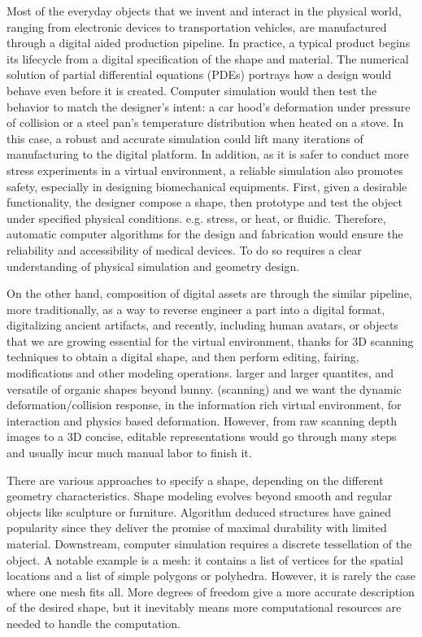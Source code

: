 Most of the everyday objects that we invent and interact in the physical world, ranging from electronic devices to transportation vehicles, are manufactured through a digital aided production pipeline.
In practice, a typical product begins its lifecycle from a digital specification of the shape and material.
The numerical solution of partial differential equations (PDEs) portrays how a design would behave even before it is created. 
Computer simulation would then test the behavior to match the designer's intent: a car hood's deformation under pressure of collision or a steel pan's temperature distribution when heated on a stove. In this case, a robust and accurate simulation could lift many iterations of manufacturing to the digital platform. In addition, as it is safer to conduct more stress experiments in a virtual environment, a reliable simulation also promotes safety, especially in designing biomechanical equipments. 
First, given a desirable functionality, the designer compose a shape, then prototype and test the object under specified physical conditions. e.g. stress, or heat, or fluidic. 
Therefore, automatic computer algorithms for the design and fabrication would ensure the reliability and accessibility of medical devices. To do so requires a clear understanding of physical simulation and geometry design.

On the other hand, composition of digital assets are through the similar pipeline, more traditionally, as a way to reverse engineer a part into a digital format, digitalizing ancient artifacts, and recently, including human avatars, or objects that we are growing essential for the virtual environment, thanks for 3D scanning techniques to obtain a digital shape, and then perform editing, fairing, modifications and other modeling operations. larger and larger quantites, and versatile of organic shapes beyond bunny. (scanning) and we want the dynamic deformation/collision response, in the information rich virtual environment, for interaction and physics based deformation. 
However, from raw scanning depth images to a 3D concise, editable representations would go through many steps and usually incur much manual labor to finish it.

There are various approaches to specify a shape, depending on the different geometry characteristics. Shape modeling evolves beyond smooth and regular objects like sculpture or furniture. Algorithm deduced structures have gained popularity since they deliver the promise of maximal durability with limited material. Downstream, computer simulation requires a discrete tessellation of the object. A notable example is a mesh: it contains a list of vertices for the spatial locations and a list of simple polygons or polyhedra. However, it is rarely the case where one mesh fits all. More degrees of freedom give a more accurate description of the desired shape, but it inevitably means more computational resources are needed to handle the computation.

